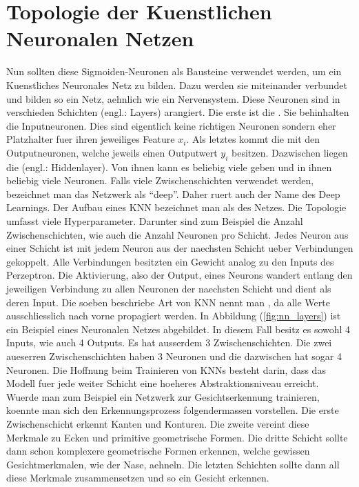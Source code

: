 \section{Topologie der Kuenstlichen Neuronalen Netzen}
Nun sollten diese Sigmoiden-Neuronen als Bausteine verwendet werden, um ein Kuenstliches
Neuronales Netz zu bilden. Dazu werden sie miteinander verbundet und bilden so ein Netz,
aehnlich wie ein Nervensystem.
Diese Neuronen sind in verschieden Schichten (engl.: Layers)
arangiert. Die erste ist die . Sie behinhalten die
Inputneuronen. Dies sind eigentlich keine richtigen
Neuronen sondern eher Platzhalter fuer ihren jeweiliges Feature $x_i$. Als letztes kommt die
 mit den Outputneuronen, welche jeweils einen Outputwert $y_i$
besitzen. Dazwischen liegen die  (engl.: Hiddenlayer). Von ihnen kann es
beliebig viele geben und in ihnen beliebig viele Neuronen.
Falls viele Zwischenschichten verwendet werden, bezeichnet man das Netzwerk als
``deep''. Daher ruert auch der Name des Deep Learnings.
Der Aufbau eines KNN bezeichnet man als  des Netzes. Die
Topologie umfasst viele Hyperparameter. Darunter sind zum Beispiel die Anzahl Zwischenschichten, wie auch
die Anzahl Neuronen pro Schicht.
\para{}
Jedes Neuron aus einer Schicht ist mit jedem Neuron aus der naechsten Schicht ueber
Verbindungen gekoppelt. Alle Verbindungen besitzten ein Gewicht analog zu den Inputs des
Perzeptron. Die Aktivierung, also der Output, eines Neurons wandert entlang den jeweiligen
Verbindung zu allen Neuronen der naechsten Schicht und dient als deren Input.
Die soeben beschriebe Art von KNN nennt man , da alle Werte
ausschliesslich nach vorne propagiert werden.
\para{}
In Abbildung (\ref{fig:nn_layers}) ist ein Beispiel eines Neuronalen Netzes
abgebildet. In diesem Fall besitz es sowohl 4 Inputs, wie auch 4 Outputs. Es hat
ausserdem 3 Zwischenschichten. Die zwei aueserren Zwischenschichten haben 3 Neuronen und die dazwischen
hat sogar 4 Neuronen.
\para{}
Die Hoffnung beim Trainieren von KNNs besteht darin, dass das Modell fuer jede
weiter Schicht eine hoeheres Abstraktionsniveau erreicht. Wuerde man zum
Beispiel ein Netzwerk zur Gesichtserkennung trainieren, koennte man sich den
Erkennungsprozess folgendermassen vorstellen. Die erste Zwischenschicht erkennt
Kanten und Konturen. Die zweite vereint diese Merkmale zu Ecken und primitive
geometrische Formen. Die dritte Schicht sollte dann schon komplexere
geometrische Formen erkennen, welche gewissen Gesichtmerkmalen, wie der Nase, aehneln. Die letzten Schichten sollte dann all diese
Merkmale zusammensetzen und so ein Gesicht erkennen.

